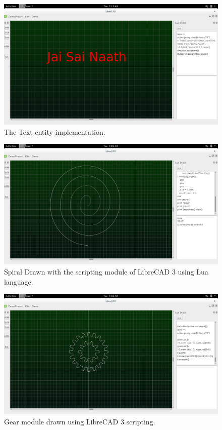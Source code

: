 \begin{figure}[h]
\begin{center}
\includegraphics[scale=0.3]{images/cad/text.png}
\caption{ The Text entity implementation. }
\end{center}
\end{figure}
\begin{figure}[h]
\begin{center}
\includegraphics[scale=0.3]{images/cad/spiral.png}
\caption{ Spiral Drawn with the scripting module of LibreCAD 3 using Lua language. }
\end{center}
\end{figure}
\begin{figure}[h]
\begin{center}
\includegraphics[scale=0.3]{images/cad/gear.png}
\caption{ Gear module drawn using LibreCAD 3 scripting.}
\end{center}
\end{figure}
